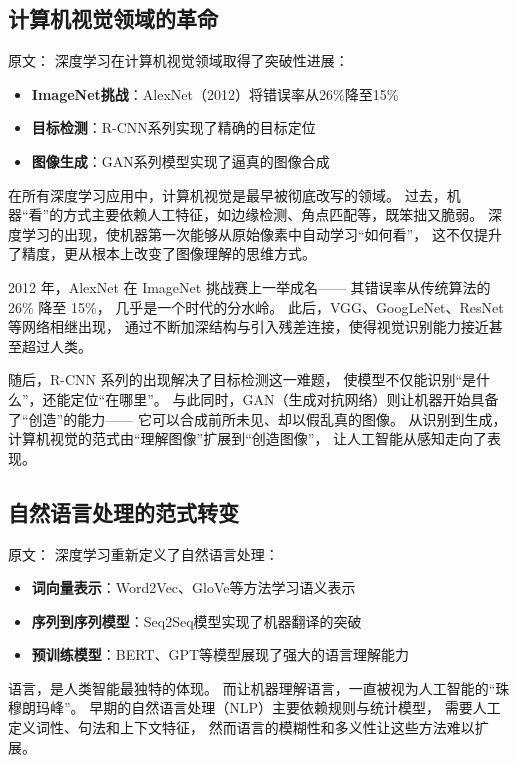 \subsection{计算机视觉领域的革命}

原文：
深度学习在计算机视觉领域取得了突破性进展：
\begin{itemize}
\item {\bf ImageNet挑战}：AlexNet（2012）将错误率从26\%降至15\%
\item {\bf 目标检测}：R-CNN系列实现了精确的目标定位
\item {\bf 图像生成}：GAN系列模型实现了逼真的图像合成
\end{itemize}
在所有深度学习应用中，计算机视觉是最早被彻底改写的领域。  
过去，机器“看”的方式主要依赖人工特征，如边缘检测、角点匹配等，既笨拙又脆弱。  
深度学习的出现，使机器第一次能够从原始像素中自动学习“如何看”，  
这不仅提升了精度，更从根本上改变了图像理解的思维方式。  

2012 年，AlexNet 在 ImageNet 挑战赛上一举成名——  
其错误率从传统算法的 26\% 降至 15\%，  
几乎是一个时代的分水岭。  
此后，VGG、GoogLeNet、ResNet 等网络相继出现，  
通过不断加深结构与引入残差连接，使得视觉识别能力接近甚至超过人类。  

随后，R-CNN 系列的出现解决了目标检测这一难题，  
使模型不仅能识别“是什么”，还能定位“在哪里”。  
与此同时，GAN（生成对抗网络）则让机器开始具备了“创造”的能力——  
它可以合成前所未见、却以假乱真的图像。  
从识别到生成，计算机视觉的范式由“理解图像”扩展到“创造图像”，  
让人工智能从感知走向了表现。


\subsection{自然语言处理的范式转变}

原文：
深度学习重新定义了自然语言处理：
\begin{itemize}
\item {\bf 词向量表示}：Word2Vec、GloVe等方法学习语义表示
\item {\bf 序列到序列模型}：Seq2Seq模型实现了机器翻译的突破
\item {\bf 预训练模型}：BERT、GPT等模型展现了强大的语言理解能力
\end{itemize}
语言，是人类智能最独特的体现。  
而让机器理解语言，一直被视为人工智能的“珠穆朗玛峰”。  
早期的自然语言处理（NLP）主要依赖规则与统计模型，  
需要人工定义词性、句法和上下文特征，  
然而语言的模糊性和多义性让这些方法难以扩展。  

